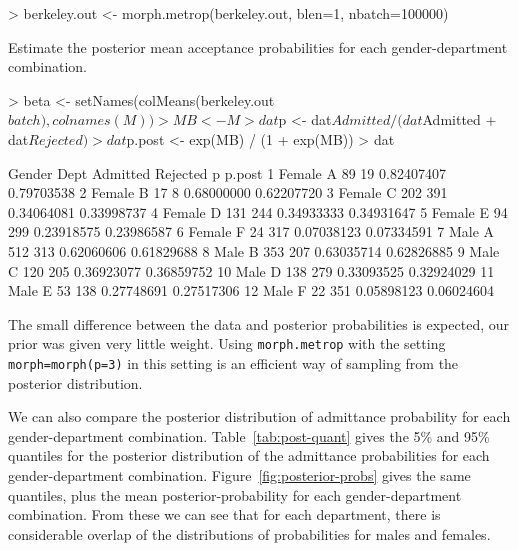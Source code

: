 \documentclass{article}
\begin{document}
\begin{Schunk}
\begin{Sinput}
> berkeley.out <- morph.metrop(berkeley.out, blen=1, nbatch=100000)
\end{Sinput}
\end{Schunk}

Estimate the posterior mean acceptance probabilities for each
gender-department combination.
\begin{Schunk}
\begin{Sinput}
> beta <- setNames(colMeans(berkeley.out$batch), colnames(M))
> MB <- M %*% beta
> dat$p <- dat$Admitted / (dat$Admitted + dat$Rejected)
> dat$p.post <- exp(MB) / (1 + exp(MB))
> dat
\end{Sinput}
\begin{Soutput}
   Gender Dept Admitted Rejected          p     p.post
1  Female    A       89       19 0.82407407 0.79703538
2  Female    B       17        8 0.68000000 0.62207720
3  Female    C      202      391 0.34064081 0.33998737
4  Female    D      131      244 0.34933333 0.34931647
5  Female    E       94      299 0.23918575 0.23986587
6  Female    F       24      317 0.07038123 0.07334591
7    Male    A      512      313 0.62060606 0.61829688
8    Male    B      353      207 0.63035714 0.62826885
9    Male    C      120      205 0.36923077 0.36859752
10   Male    D      138      279 0.33093525 0.32924029
11   Male    E       53      138 0.27748691 0.27517306
12   Male    F       22      351 0.05898123 0.06024604
\end{Soutput}
\end{Schunk}
The small difference between the data and posterior probabilities is
expected, our prior was given very little weight.  Using
\texttt{morph.metrop} with the setting \texttt{morph=morph(p=3)} in this
setting is an efficient way of sampling from the posterior distribution.

We can also compare the posterior distribution of admittance
probability for each gender-department combination.
Table~\ref{tab:post-quant} gives the 5\% and 95\% quantiles for the
posterior distribution of the admittance probabilities for each
gender-department combination.  Figure~\ref{fig:posterior-probs} gives
the same quantiles, plus the mean posterior-probability for each
gender-department combination.  From these we can see that for each
department, there is considerable overlap of the distributions of
probabilities for males and females.

\begin{Schunk}
\end{Schunk}
\end{document}
